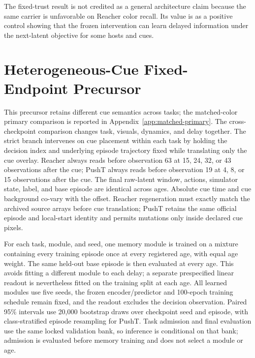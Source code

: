 The fixed-trust result is not credited as a general architecture claim because the same carrier is unfavorable on Reacher color recall. Its value is as a positive control showing that the frozen intervention can learn delayed information under the next-latent objective for some hosts and cues.

\section{Heterogeneous-Cue Fixed-Endpoint Precursor}
\label{app:cue-age}

This precursor retains different cue semantics across tasks; the matched-color primary comparison is reported in Appendix~\ref{app:matched-primary}. The cross-checkpoint comparison changes task, visuals, dynamics, and delay together. The strict branch intervenes on cue placement within each task by holding the decision index and underlying episode trajectory fixed while translating only the cue overlay. Reacher always reads before observation 63 at 15, 24, 32, or 43 observations after the cue; PushT always reads before observation 19 at 4, 8, or 15 observations after the cue. The final raw-latent window, actions, simulator state, label, and base episode are identical across ages. Absolute cue time and cue background co-vary with the offset. Reacher regeneration must exactly match the archived source arrays before cue translation; PushT retains the same official episode and local-start identity and permits mutations only inside declared cue pixels.

For each task, module, and seed, one memory module is trained on a mixture containing every training episode once at every registered age, with equal age weight. The same held-out base episode is then evaluated at every age. This avoids fitting a different module to each delay; a separate prespecified linear readout is nevertheless fitted on the training split at each age. All learned modules use five seeds, the frozen encoder/predictor and 100-epoch training schedule remain fixed, and the readout excludes the decision observation. Paired 95\% intervals use 20,000 bootstrap draws over checkpoint seed and episode, with class-stratified episode resampling for PushT. Task admission and final evaluation use the same locked validation bank, so inference is conditional on that bank; admission is evaluated before memory training and does not select a module or age.


